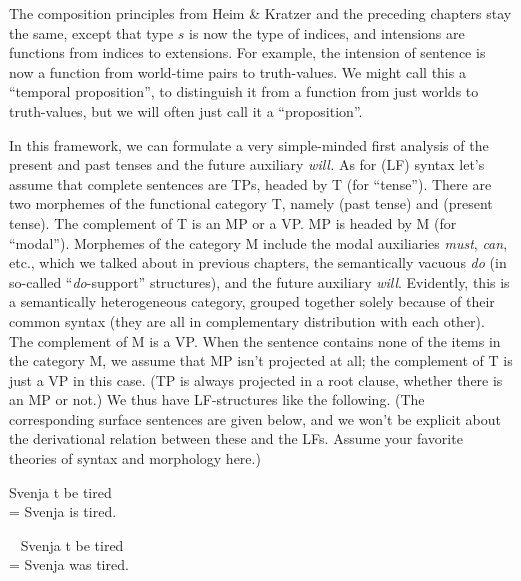 The composition principles from Heim \& Kratzer and the preceding chapters stay
the same, except that type $s$ is now the type of indices, and intensions are
functions from indices to extensions. For example, the intension of sentence is
now a function from world-time pairs to truth-values. %
%
We might call this a ``temporal proposition'', to distinguish it from a function
from just worlds to truth-values, but we will often just call it a
``proposition''.

In this framework, we can formulate a very simple-minded first analysis of the
present and past tenses and the future auxiliary \emph{will.} As for (LF) syntax
let’s assume that complete sentences are TPs, headed by T (for ``tense''). There
are two morphemes of the functional category T, namely \past (past tense) and
\pres (present tense). The complement of T is an MP or a VP. MP is headed by M
(for ``modal''). Morphemes of the category M include the modal auxiliaries
\emph{must}, \emph{can}, etc., which we talked about in previous chapters, the
semantically vacuous \emph{do} (in so-called ``\emph{do}-support'' structures),
and the future auxiliary \emph{will}. Evidently, this is a semantically
heterogeneous category, grouped together solely because of their common syntax
(they are all in complementary distribution with each other). The complement of
M is a VP. When the sentence contains none of the items in the category M, we
assume that MP isn’t projected at all; the complement of T is just a VP in this
case. %
%
(TP is always projected in a root clause, whether there is an MP or not.) We
thus have LF-structures like the following. (The corresponding surface sentences
are given below, and we won’t be explicit about the derivational relation
between these and the LFs. Assume your favorite theories of syntax and
morphology here.)

\ex \lb[TP] Svenja \lb[T$'$] \pres \lb[VP] t \lb[V$'$] be tired \rb \rb \rb \rb\\
= Svenja is tired.\label{ex:is-tired} \xe

\ex~ \lb[TP] Svenja \lb[T$'$] \past \lb[VP] t \lb[V$'$] be tired \rb \rb \rb \rb\\
= Svenja was tired.\label{ex:was-tired} \xe

